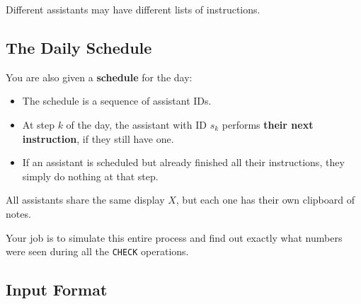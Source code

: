 Different assistants may have different lists of instructions.

\subsection*{The Daily Schedule}

You are also given a \textbf{schedule} for the day:
\begin{itemize}
    \item The schedule is a sequence of assistant IDs.
    \item At step \(k\) of the day, the assistant with ID \(s_k\) performs
    \textbf{their next instruction}, if they still have one.
    \item If an assistant is scheduled but already finished all their
    instructions, they simply do nothing at that step.
\end{itemize}

All assistants share the same display \(X\), but each one has their own
clipboard of notes.

Your job is to simulate this entire process and find out exactly what numbers
were seen during all the \texttt{CHECK} operations.

\subsection*{Input Format}

